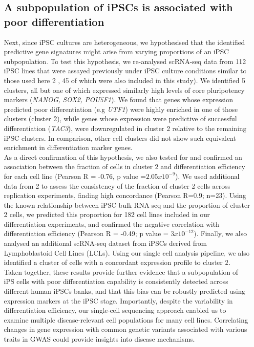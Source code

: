 \subsection{A subpopulation of iPSCs is associated with poor differentiation}

Next, since iPSC cultures are heterogeneous, we hypothesised that the identified predictive gene signatures might arise from varying proportions of an iPSC subpopulation. 
To test this hypothesis, we re-analysed scRNA-seq data from 112 iPSC lines that were assayed previously under iPSC culture conditions similar to those used here 2 
\cite{cuomo2020single}, 45 of which were also included in this study). 
We identified 5 clusters, all but one of which expressed similarly high levels of core pluripotency markers (\textit{NANOG, SOX2, POU5F1}). 
We found that genes whose expression predicted poor differentiation (e.g \textit{UTF1}) were highly enriched in one of those clusters (cluster 2), while genes whose expression were predictive of successful differentiation (\textit{TAC3}), were downregulated in cluster 2 relative to the remaining iPSC clusters. 
In comparison, other cell clusters did not show such equivalent enrichment in differentiation marker genes.\\

As a direct confirmation of this hypothesis, we also tested for and confirmed an association between the fraction of cells in cluster 2 and differentiation efficiency for each cell line (Pearson R = -0.76, p value =$2.05x10^{-9}$). 
We used additional data from 2 to assess the consistency of the fraction of cluster 2 cells across replication experiments, finding high concordance (Pearson R=0.9; n=23).
Using the known relationship between iPSC bulk RNA-seq and the proportion of cluster 2 cells, we predicted this proportion for 182 cell lines included in our differentiation experiments, and confirmed the negative correlation with differentiation efficiency (Pearson R = -0.49; p value = $3x10^{-12}$). 
Finally, we also analysed an additional scRNA-seq dataset from iPSCs derived from Lymphoblastoid Cell Lines \cite{sarkar2019discovery} (LCLs). 
Using our single cell analysis pipeline, we also identified a cluster of cells with a concordant expression profile to cluster 2. 
Taken together, these results provide further evidence that a subpopulation of iPS cells with poor differentiation capability is consistently detected across different human iPSCs banks, and that this bias can be robustly predicted using expression markers at the iPSC stage. 
Importantly, despite the variability in differentiation efficiency, our single-cell sequencing approach enabled us to examine multiple disease-relevant cell populations for many cell lines. Correlating changes in gene expression with common genetic variants associated with various traits in GWAS could provide insights into disease mechanisms.


